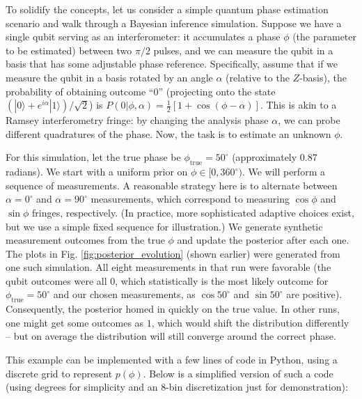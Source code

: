 To solidify the concepts, let us consider a simple quantum phase
estimation scenario and walk through a Bayesian inference
simulation. Suppose we have a single qubit serving as an
interferometer: it accumulates a phase $\phi$ (the parameter to be
estimated) between two $\pi/2$ pulses, and we can measure the qubit in
a basis that has some adjustable phase reference. Specifically, assume
that if we measure the qubit in a basis rotated by an angle $\alpha$
(relative to the $Z$-basis), the probability of obtaining outcome
“$0$” (projecting onto the state $(|0\rangle +
e^{i\alpha}|1\rangle)/\sqrt{2}$) is $P(0|\phi,\alpha) = \frac{1}{2}[1
  + \cos(\phi - \alpha)]$. This is akin to a Ramsey interferometry
fringe: by changing the analysis phase $\alpha$, we can probe
different quadratures of the phase. Now, the task is to estimate an
unknown $\phi$.



For this simulation, let the true phase be $\phi_{\text{true}} =
50^\circ$ (approximately $0.87$ radians). We start with a uniform
prior on $\phi \in [0,360^\circ)$. We will perform a sequence of
  measurements. A reasonable strategy here is to alternate between
  $\alpha=0^\circ$ and $\alpha=90^\circ$ measurements, which
  correspond to measuring $\cos\phi$ and $\sin\phi$ fringes,
  respectively. (In practice, more sophisticated adaptive choices
  exist, but we use a simple fixed sequence for illustration.) We
  generate synthetic measurement outcomes from the true $\phi$ and
  update the posterior after each one. The plots in
  Fig. \ref{fig:posterior_evolution} (shown earlier) were generated
  from one such simulation. All eight measurements in that run were
  favorable (the qubit outcomes were all $0$, which statistically is
  the most likely outcome for $\phi_{\text{true}}=50^\circ$ and our
  chosen measurements, as $\cos 50^\circ$ and $\sin 50^\circ$ are
  positive). Consequently, the posterior homed in quickly on the true
  value. In other runs, one might get some outcomes as $1$, which
  would shift the distribution differently – but on average the
  distribution will still converge around the correct phase.



This example can be implemented with a few lines of code in Python,
using a discrete grid to represent $p(\phi)$. Below is a simplified
version of such a code (using degrees for simplicity and an 8-bin
discretization just for demonstration):

